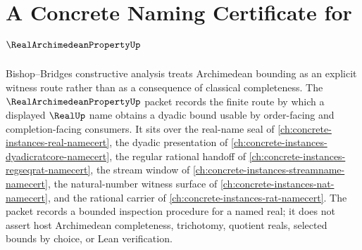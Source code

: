 \chapter{A Concrete Naming Certificate for $\RealArchimedeanPropertyUp$}
\label{ch:concrete-instances-real-archimedean-property-namecert}

Bishop--Bridges constructive analysis treats Archimedean bounding as an explicit witness route rather than as a consequence of classical completeness. The $\RealArchimedeanPropertyUp$ packet records the finite route by which a displayed $\RealUp$ name obtains a dyadic bound usable by order-facing and completion-facing consumers. It sits over the real-name seal of \autoref{ch:concrete-instances-real-namecert}, the dyadic presentation of \autoref{ch:concrete-instances-dyadicratcore-namecert}, the regular rational handoff of \autoref{ch:concrete-instances-regseqrat-namecert}, the stream window of \autoref{ch:concrete-instances-streamname-namecert}, the natural-number witness surface of \autoref{ch:concrete-instances-nat-namecert}, and the rational carrier of \autoref{ch:concrete-instances-rat-namecert}. The packet records a bounded inspection procedure for a named real; it does not assert host Archimedean completeness, trichotomy, quotient reals, selected bounds by choice, or Lean verification.

